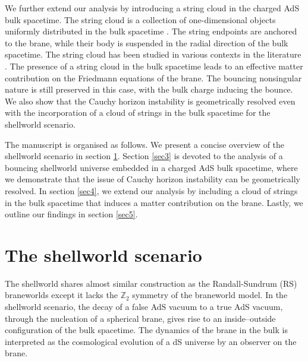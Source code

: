 \documentclass[12pt]{article}
\begin{document}
We further extend our analysis by introducing a string cloud in the charged AdS bulk spacetime. The string cloud is a collection of one-dimensional objects uniformly distributed in the bulk spacetime \cite{Letelier:1979ej}. The string endpoints are anchored to the brane, while their body is suspended in the radial direction of the bulk spacetime. The string cloud has been studied in various contexts in the literature \cite{Chakrabortty:2011sp,Dey:2017xty,Pokhrel:2023plp,Park:2020jio}. The presence of a string cloud in the bulk spacetime leads to an effective matter contribution on the Friedmann equations of the brane. The bouncing nonsingular nature is still preserved in this case, with the bulk charge inducing the bounce. We also show that the Cauchy horizon instability is geometrically resolved even with the incorporation of a cloud of strings in the bulk spacetime for the shellworld scenario.

The manuscript is organised as follows. We present a concise overview of the shellworld scenario in section \ref{sec2}. Section \ref{sec3} is devoted to the analysis of a bouncing shellworld universe embedded in a charged AdS bulk spacetime, where we demonstrate that the issue of Cauchy horizon instability can be geometrically resolved. In section \ref{sec4}, we extend our analysis by including a cloud of strings in the bulk spacetime that induces a matter contribution on the brane. Lastly, we outline our findings in section \ref{sec5}.


\section{The shellworld scenario}\label{sec2}

The shellworld shares almost similar construction as the Randall-Sundrum (RS) braneworlds except it lacks the $\mathbb{Z}_2$ symmetry of the braneworld model. In the shellworld scenario, the decay of a false AdS vacuum to a true AdS vacuum, through the nucleation of a spherical brane, gives rise to an inside–outside configuration of the bulk spacetime. The dynamics of the brane in the bulk is interpreted as the cosmological evolution of a dS universe by an observer on the brane.
\end{document}
